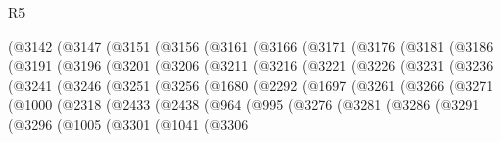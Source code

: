 \begin{lexlean}{R5}
\begin{coremodule}
        (@3142
          (@3147
            (@3151
              (@3156
                (@3161
                  (@3166
                    (@3171
                      (@3176
                        (@3181
                          (@3186
                            (@3191
                              (@3196
                                (@3201
                                  (@3206
                                    (@3211
                                      (@3216
                                        (@3221
                                          (@3226
                                            (@3231
                                              (@3236
                                                (@3241
                                                  (@3246
                                                    (@3251
                                                      (@3256
                                                        (@1680
                                                          (@2292
                                                            (@1697
                                                              (@3261
                                                                (@3266
                                                                  (@3271
                                                                    (@1000
                                                                      (@2318
                                                                        (@2433
                                                                          (@2438
                                                                            (@964
                                                                              (@995
                                                                                (@3276
                                                                                  (@3281
                                                                                    (@3286
                                                                                      (@3291
                                                                                        (@3296
                                                                                          (@1005
                                                                                            (@3301
                                                                                              (@1041
                                                                                                (@3306

\end{coremodule}
\end{lexlean}
